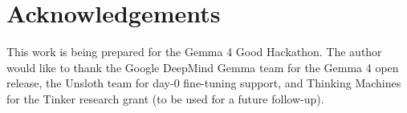 \documentclass{article}
\theoremstyle{plain}
\theoremstyle{definition}
\theoremstyle{remark}
\begin{document}
\section{Acknowledgements}

This work is being prepared for the Gemma 4 Good Hackathon. The author would like to thank the Google DeepMind Gemma team for the Gemma 4 open release, the Unsloth team for day-0 fine-tuning support, and Thinking Machines for the Tinker research grant (to be used for a future follow-up).
\end{document}
